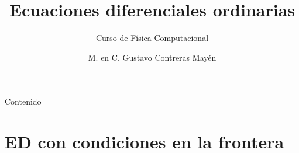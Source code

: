 


\normalfont
\usepackage{ccfonts}%
\usepackage[T1]{fontenc}%
\renewcommand{\rmdefault}{cmr}%
\linespread{1.3}
\title{Ecuaciones diferenciales ordinarias}
\subtitle{Curso de Física Computacional}
\author[]{M. en C. Gustavo Contreras Mayén}

\newcommand{\localtextbulletone}{\textcolor{gray}{\raisebox{.45ex}{\rule{.6ex}{.6ex}}}}
\maketitle
\fontsize{14}{14}\selectfont
{}
\begin{frame}{Contenido}
\tableofcontents[pausesections]
\end{frame}
\section{ED con condiciones en la frontera}
